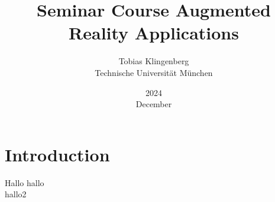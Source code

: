 \documentclass{article}
\title{Seminar Course Augmented Reality Applications}
\author{Tobias Klingenberg\\ Technische Universität München}
\date{2024\\December}
\begin{document}
    \maketitle

    \section*{Introduction}
    Hallo
    \cite{ar1} hallo\\
    \cite{ar2} hallo2
    

    \medskip

    \printbibliography
\end{document}
